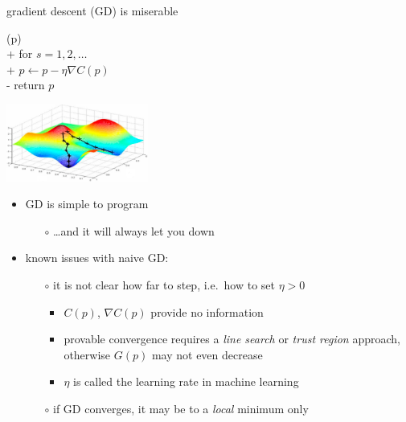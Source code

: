 \documentclass[xcolor={svgnames},
               hyperref={colorlinks,citecolor=DeepPink4,linkcolor=FireBrick,urlcolor=Maroon}]
               {beamer}
\newcommand{\grad}{\nabla}
\begin{document}
\begin{frame}{gradient descent (GD) is miserable}

\begin{pseudo*}
(p)\text{:} \\+
    for $s = 1,2,\dots$ \\+
        $p \gets p - \eta \grad C(p)$ \\-
    return $p$
\end{pseudo*}

\vspace{-25mm}
\hfill \includegraphics[width=0.35\textwidth]{figs/gdsurface} \phantom{adslj}

\medskip
\begin{itemize}
\item GD is simple to program
    \begin{itemize}
    \item[$\circ$] \dots and it will always let you down
    \end{itemize}
\item known issues with naive GD:
    \begin{itemize}
    \item[$\circ$] it is not clear how far to step, i.e.~how to set $\eta>0$
        \begin{itemize}
        \item $C(p)$, $\grad C(p)$ provide no information
        \item provable convergence requires a \emph{line search} or \emph{trust region} approach,  otherwise $G(p)$ may not even decrease
        \item $\eta$ is called the \alert{learning rate} in machine learning
        \end{itemize}
    \item[$\circ$] if GD converges, it may be to a \emph{local} minimum only
    \end{itemize}
\end{itemize}
\end{frame}
\end{document}
